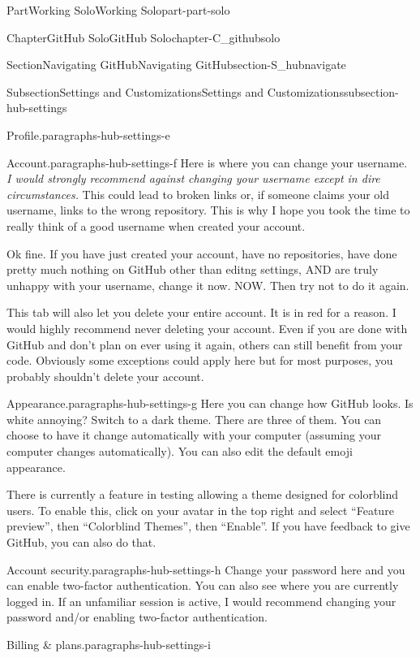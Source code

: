 \documentclass[twoside,10pt,]{book}
\begin{document}
\begin{partptx}{Part}{Working Solo}{}{Working Solo}{}{}{part-part-solo}
\begin{chapterptx}{Chapter}{GitHub Solo}{}{GitHub Solo}{}{}{chapter-C_githubsolo}
\begin{sectionptx}{Section}{Navigating GitHub}{}{Navigating GitHub}{}{}{section-S_hubnavigate}
\begin{subsectionptx}{Subsection}{Settings and Customizations}{}{Settings and Customizations}{}{}{subsection-hub-settings}
\begin{paragraphs}{Profile.}{paragraphs-hub-settings-e}
\end{paragraphs}%
\begin{paragraphs}{Account.}{paragraphs-hub-settings-f}%
%
Here is where you can change your username. \emph{I would strongly recommend against changing your username except in dire circumstances.} This could lead to broken links or, if someone claims your old username, links to the wrong repository. This is why I hope you took the time to really think of a good username when created your account.%
\par
Ok fine. If you have just created your account, have no repositories, have done pretty much nothing on GitHub other than editng settings, AND are truly unhappy with your username, change it now. NOW. Then try not to do it again.%
\par
This tab will also let you delete your entire account. It is in red for a reason. I would highly recommend never deleting your account. Even if you are done with GitHub and don't plan on ever using it again, others can still benefit from your code. Obviously some exceptions could apply here but for most purposes, you probably shouldn't delete your account.%
\end{paragraphs}%
\begin{paragraphs}{Appearance.}{paragraphs-hub-settings-g}%
%
Here you can change how GitHub looks. Is white annoying? Switch to a dark theme. There are three of them. You can choose to have it change automatically with your computer (assuming your computer changes automatically). You can also edit the default emoji appearance.%
\par
There is currently a feature in testing allowing a theme designed for colorblind users. To enable this, click on your avatar in the top right and select ``Feature preview'', then ``Colorblind Themes'', then ``Enable''. If you have feedback to give GitHub, you can also do that.%
\end{paragraphs}%
\begin{paragraphs}{Account security.}{paragraphs-hub-settings-h}%
%
Change your password here and you can enable two-factor authentication. You can also see where you are currently logged in. If an unfamiliar session is active, I would recommend changing your password and\slash{}or enabling two-factor authentication.%
\end{paragraphs}%
\begin{paragraphs}{Billing \& plans.}{paragraphs-hub-settings-i}%
%

\end{paragraphs}
\end{subsectionptx}
\end{sectionptx}
\end{chapterptx}
\end{partptx}
\end{document}
